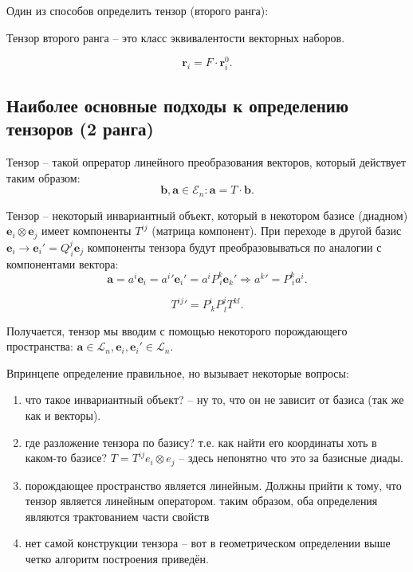 Один из способов определить тензор (второго ранга):

\begin{definition}
  Тензор второго ранга -- это класс эквивалентости векторных наборов.
\end{definition}

\[
  \mathbf{r}_i = F \cdot \mathbf{r}_i^0.
\]
\newline

\subsection{Наиболее основные подходы к определению тензоров (2 ранга)}

\begin{definition}
  Тензор -- такой опрератор линейного преобразования векторов, который действует таким образом:
  \[
    \mathbf{b}, \mathbf{a} \in \mathcal{E}_n : \mathbf{a} = T \cdot \mathbf{b}.
  \]
\end{definition}

\begin{definition}
  Тензор -- некоторый инвариантный объект, который в некотором базисе (диадном) $\mathbf{e}_i \otimes \mathbf{e}_j$ имеет компоненты $T^{ij}$ (матрица компонент).
  При переходе в другой базис $\mathbf{e}_i \to \mathbf{e}_i' = Q^j_{\, i} \mathbf{e}_j$ компоненты тензора
  будут преобразовываться по аналогии с компонентами вектора:
  \[
    \mathbf{a} = a^i \mathbf{e}_i = {a^i}' {\mathbf{e}_i}' = a^i P^k_{\,i} \mathbf{e}_k'
    \Rightarrow
    {a^k}' = P^k_{\, i} a^i.
  \]

  \[
    {T^{ij}}' = P^i_{\, k} P^j_{\, l} T^{kl}.
  \]

\end{definition}

Получается, тензор мы вводим с помощью некоторого порождающего пространства:
$\mathbf{a} \in \mathcal{L}_n, \mathbf{e}_i, \mathbf{e}_i' \in \mathcal{L}_n$.

Впринцепе определение правильное, но вызывает некоторые вопросы:
\begin{enumerate}
  \item что такое инвариантный объект? -- ну то, что он не зависит от базиса (так же как и векторы).

  \item где разложение тензора по базису? т.е. как найти его координаты хоть в каком-то базисе? 
    $T = T^{ij} e_i \otimes e_j$ -- здесь непонятно что это за базисные диады.

  \item порождающее пространство является линейным. Должны прийти к тому, что тензор является
    линейным оператором. таким образом, оба определения являются трактованием части свойств
    
    \begin{figure}[H]
    	\centering
    	
    \end{figure}

  \item нет самой конструкции тензора -- вот в геометрическом определении выше четко алгоритм 
    построения приведён.
\end{enumerate}

